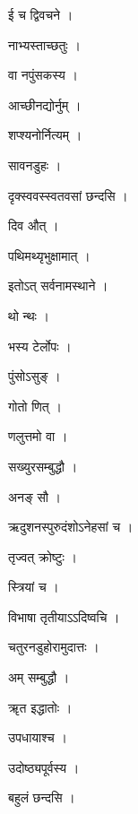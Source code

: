 \documentclass[10pt, openany]{book}
\begin{document}
\noindent ई च द्विवचने ।

\noindent नाभ्यस्ताच्छतुः ।

\noindent वा नपुंसकस्य ।

\noindent आच्छीनद्योर्नुम् ।

\noindent शप्श्यनोर्नित्यम् ।

\noindent सावनडुहः ।

\noindent दृक्स्ववस्स्वतवसां छन्दसि ।

\noindent दिव औत् ।

\noindent पथिमथ्यृभुक्षामात् ।

\noindent इतोऽत् सर्वनामस्थाने ।

\noindent थो न्थः ।

\noindent भस्य टेर्लोपः ।

\noindent पुंसोऽसुङ् ।

\noindent गोतो णित् ।

\noindent णलुत्तमो वा ।

\noindent सख्युरसम्बुद्धौ ।

\noindent अनङ् सौ ।

\noindent ऋदुशनस्पुरुदंशोऽनेहसां च ।

\noindent तृज्वत् क्रोष्टुः ।

\noindent स्त्रियां च ।

\noindent विभाषा तृतीयाऽऽदिष्वचि ।

\noindent चतुरनडुहोरामुदात्तः ।

\noindent अम् सम्बुद्धौ ।

\noindent ॠत इद्धातोः ।

\noindent उपधायाश्च ।

\noindent उदोष्ठ्यपूर्वस्य ।

\noindent बहुलं छन्दसि ।
\end{document}
